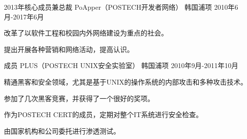 

\begin{cventries}

  \cventry
    {2013年核心成员兼总裁} %
    {PoApper（POSTECH开发者网络）} %
    {韩国浦项} %
    {2010年6月-2017年6月} %
    {
      \begin{cvitems} %
        \item {改革了以软件工程和校园内外网络建设为重点的社会。}
        \item {提出开展各种营销和网络活动，提高认识。}
      \end{cvitems}
    }

  \cventry
    {成员} %
    {PLUS（POSTECH UNIX安全实验室）} %
    {韩国浦项} %
    {2010年9月-2011年10月} %
    {
      \begin{cvitems} %
        \item {精通黑客和安全领域，尤其是基于UNIX的操作系统的内部攻击和多种攻击技术。}
        \item {参加了几次黑客竞赛，并获得了一个很好的奖项。}
        \item {作为POSTECH CERT的成员，定期对整个IT系统进行安全检查。}
        \item {由国家机构和公司委托进行渗透测试。}
      \end{cvitems}
    }

\end{cventries}
